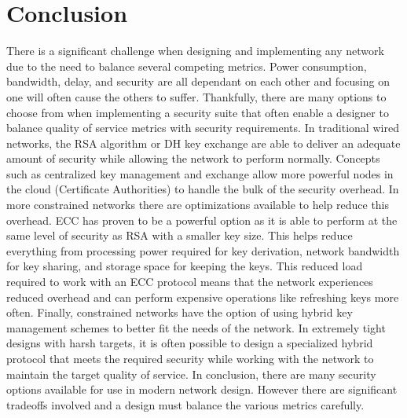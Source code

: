 \documentclass[journal]{IEEEtran}
\begin{document}
\section{Conclusion}
There is a significant challenge when designing and implementing any network due to the need to balance several competing metrics. Power consumption, bandwidth, delay, and security are all dependant on each other and focusing on one will often cause the others to suffer. Thankfully, there are many options to choose from when implementing a security suite that often enable a designer to balance quality of service metrics with security requirements. In traditional wired networks, the RSA algorithm or DH key exchange are able to deliver an adequate amount of security while allowing the network to perform normally. Concepts such as centralized key management and exchange allow more powerful nodes in the cloud (Certificate Authorities) to handle the bulk of the security overhead. In more constrained networks there are optimizations available to help reduce this overhead. ECC has proven to be a powerful option as it is able to perform at the same level of security as RSA with a smaller key size. This helps reduce everything from processing power required for key derivation, network bandwidth for key sharing, and storage space for keeping the keys. This reduced load required to work with an ECC protocol means that the network experiences reduced overhead and can perform expensive operations like refreshing keys more often. Finally, constrained networks have the option of using hybrid key management schemes to better fit the needs of the network. In extremely tight designs with harsh targets, it is often possible to design a specialized hybrid protocol that meets the required security while working with the network to maintain the target quality of service. In conclusion, there are many security options available for use in modern network design. However there are significant tradeoffs involved and a design must balance the various metrics carefully.
\vspace{25mm}


\end{document}
